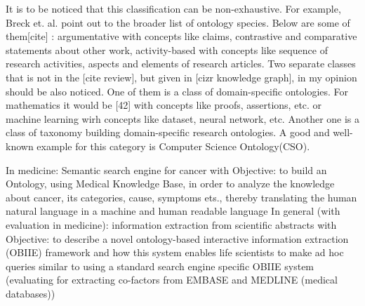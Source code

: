 		It is to be noticed that this classification can be non-exhaustive. For example, Breck et. al. point out to the broader list of ontology species. Below are some of them[cite] : argumentative with concepts like claims, contrastive and comparative statements about other work, activity-based with concepts like sequence of research activities, aspects and elements of research articles. Two separate classes that is not in the [cite review], but given in [cizr knowledge graph], in my opinion should be also noticed. One of them is a class of domain-specific ontologies. For mathematics it would be [42] with concepts like proofs, assertions, etc. or machine learning wirh concepts like dataset, neural network, etc. Another one is a class of taxonomy building domain-specific research ontologies. A good and well-known example for this category is Computer Science Ontology(CSO).     
		
		In medicine: Semantic search engine for cancer \cite{Raj14} with Objective: \newline
		 to build an Ontology, using Medical Knowledge Base, in order to analyze the knowledge about cancer, its categories, cause, symptoms ets., thereby translating the human natural language in a machine and human readable language \newline \newline
		In general (with evaluation in medicine): information extraction from scientific abstracts \cite{Mil05} with Objective: \newline
		to describe a novel ontology-based interactive information extraction (OBIIE) framework and how this system enables life scientists to make
		ad hoc queries similar to using a standard search engine
		specific OBIIE system (evaluating  for extracting
		co-factors from EMBASE and MEDLINE (medical databases))
